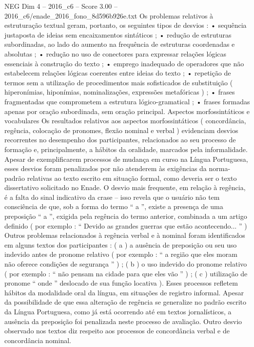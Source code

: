 \begin{textsample}{NEG Dim 4 – 2016\_c6 – Score 3.00 – 2016\_c6/enade\_2016\_fono\_8d596b926e.txt}
Os problemas relativos à estruturação textual geram, portanto, os seguintes tipos de desvios : • sequência justaposta de ideias sem encaixamentos sintáticos ; • redução de estruturas subordinadas, ao lado do aumento na frequência de estruturas coordenadas e absolutas ; • redução no uso de conectores para expressar relações lógicas essenciais à construção do texto ; • emprego inadequado de operadores que não estabelecem relações lógicas coerentes entre ideias do texto ; • repetição de termos sem a utilização de procedimentos mais sofisticados de substituição ( hiperonímias, hiponímias, nominalizações, expressões metafóricas ) ; • frases fragmentadas que comprometem a estrutura lógico-gramatical ; • frases formadas apenas por oração subordinada, sem oração principal.
Aspectos morfossintáticos e vocabulares Os resultados relativos aos aspectos morfossintáticos ( concordância, regência, colocação de pronomes, flexão nominal e verbal ) evidenciam desvios recorrentes no desempenho dos participantes, relacionados ao seu processo de formação e, principalmente, a hábitos da oralidade, marcados pela informalidade.
Apesar de exemplificarem processos de mudança em curso na Língua Portuguesa, esses desvios foram penalizados por não atenderem às exigências da norma-padrão relativas ao texto escrito em situação formal, como deveria ser o texto dissertativo solicitado no Enade.
O desvio mais frequente, em relação à regência, é a falta do sinal indicativo da crase – isso revela que o usuário não tem consciência de que, sob a forma do termo “ a ”, existe a presença de uma preposição “ a ”, exigida pela regência do termo anterior, combinada a um artigo definido ( por exemplo : “ Devido as grandes guerras que estão acontecendo... ” ) Outros problemas relacionados à regência verbal e à nominal foram identificados em alguns textos dos participantes : ( a ) a ausência de preposição ou seu uso indevido antes de pronome relativo ( por exemplo : “ a região que eles moram não oferece condições de segurança ” ) ; ( b ) o uso indevido do pronome relativo ( por exemplo : “ não pensam na cidade para que eles vão ” ) ; ( c ) utilização de pronome “ onde ” deslocado de sua função locativa ).
Esses processos refletem hábitos da modalidade oral da língua, em situações de registro informal.
Apesar da possibilidade de que essa alteração de regência se generalize no padrão escrito da Língua Portuguesa, como já está ocorrendo até em textos jornalísticos, a ausência da preposição foi penalizada neste processo de avaliação.
Outro desvio observado nos textos diz respeito aos processos de concordância verbal e de concordância nominal.

\end{textsample}
